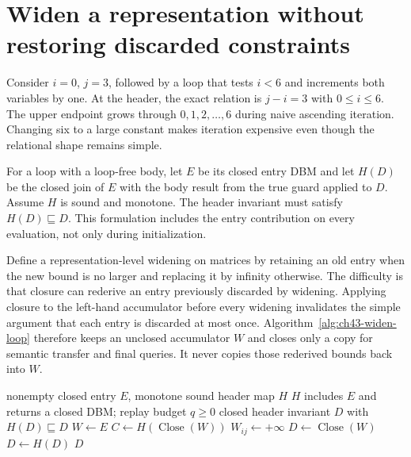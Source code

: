 \section{Widen a representation without restoring discarded constraints}
\label{sec:ch43-widening}

Consider $i=0$, $j=3$, followed by a loop that tests $i<6$ and increments both variables by one.
At the header, the exact relation is $j-i=3$ with $0\leq i\leq6$.
The upper endpoint grows through $0,1,2,\ldots,6$ during naive ascending iteration.
Changing six to a large constant makes iteration expensive even though the relational shape remains simple.

For a loop with a loop-free body, let $E$ be its closed entry DBM and let $H(D)$ be the closed join of $E$ with the body result from the true guard applied to $D$.
Assume $H$ is sound and monotone.
The header invariant must satisfy $H(D)\sqsubseteq D$.
This formulation includes the entry contribution on every evaluation, not only during initialization.

Define a representation-level widening on matrices by retaining an old entry when the new bound is no larger and replacing it by infinity otherwise.
The difficulty is that closure can rederive an entry previously discarded by widening.
Applying closure to the left-hand accumulator before every widening invalidates the simple argument that each entry is discarded at most once.
Algorithm~\ref{alg:ch43-widen-loop} therefore keeps an unclosed accumulator $W$ and closes only a copy for semantic transfer and final queries.
It never copies those rederived bounds back into $W$.

\begin{algorithm}
\caption{Solve one DBM loop header with raw widening and bounded replay.}
\label{alg:ch43-widen-loop}
\begin{pseudocode}
\Require nonempty closed entry $E$, monotone sound header map $H$
\Require $H$ includes $E$ and returns a closed DBM; replay budget $q\geq0$
\Ensure closed header invariant $D$ with $H(D)\sqsubseteq D$
\State $W\gets E$
\Loop
  \State $C\gets H(\operatorname{Close}(W))$
    \State \Break
  \EndIf
      \State $W_{ij}\gets+\infty$
    \EndIf
  \EndFor
\EndLoop
\State $D\gets\operatorname{Close}(W)$
  \State $D\gets H(D)$
\EndFor
\State \Return $D$
\end{pseudocode}
\end{algorithm}

